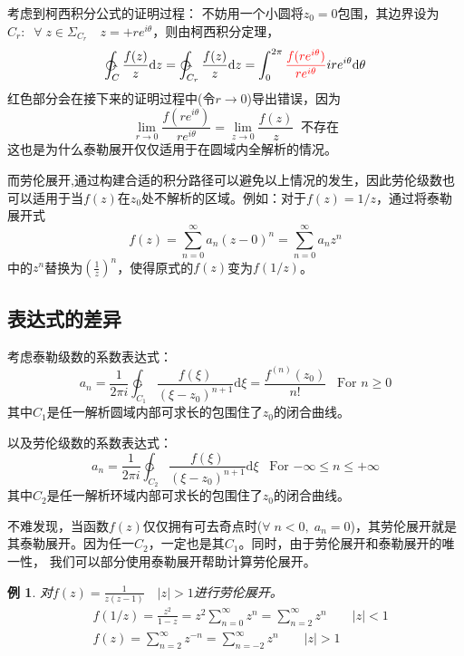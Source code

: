 \documentclass[12pt, a4paper, oneside]{ctexart}
\newtheorem{example}[theorem]{例}
\def\D{\mathrm{d}}
\newcommand{\F}[1][z]
{\ensuremath{f(#1)}}
\begin{document}
考虑到柯西积分公式的证明过程：
不妨用一个小圆将$z_0=0$包围，其边界设为$\displaystyle C_r: \;\;\forall \; z\in \Sigma_{C_r}\quad z=+re^{i\theta}$，则由柯西积分定理，
\begin{align*}
    \ointctrclockwise_C \frac{\F}{z}\D z =\ointctrclockwise_{C_r}\frac{\F}{z}\D z =\int_0^{2\pi}{\color{red}\frac{\F[re^{i\theta}]}{re^{i\theta}}}ire^{i\theta}\D \theta
\end{align*}
{\color{red} 红色}部分会在接下来的证明过程中(令$r\to 0$)导出错误，因为
$$
    \lim_{r\to 0} \frac{\F[re^{i\theta}]}{re^{i\theta}} = \lim_{z\to 0} \frac{f(z)}{z} \;\; \text{不存在}
$$
这也是为什么泰勒展开仅仅适用于在圆域内全解析的情况。

而劳伦展开,通过构建合适的积分路径可以避免以上情况的发生，因此劳伦级数也可以适用于当$f(z)$在$z_0$处不解析的区域。例如：对于$f(z)=1/z$，通过将泰勒展开式
$$
    f(z)=\sum_{n=0}^\infty a_n(z-0)^n=\sum_{n=0}^\infty a_n z^n
$$
中的$z^n$替换为$\displaystyle(\frac{1}{z})^n$，使得原式的$f(z)$变为$f(1/z)$。

\subsection{表达式的差异}

考虑泰勒级数的系数表达式：
$$
    a_n=\frac{1}{2\pi i}\ointctrclockwise_{C_1} \frac{\F[\xi]}{(\xi-z_0)^{n+1}}\D \xi=\frac{f^{(n)}(z_0)}{n!}\;\;\; \text{For $n\ge 0$}
$$
其中$C_1$是任一解析圆域内部可求长的包围住了$z_0$的闭合曲线。

以及劳伦级数的系数表达式：
$$
    a_n=\frac{1}{2\pi i}\ointctrclockwise_{C_2} \frac{\F[\xi]}{(\xi-z_0)^{n+1}}\D \xi \;\;\; \text{For $-\infty \le n\le +\infty$}
$$
其中$C_2$是任一解析环域内部可求长的包围住了$z_0$的闭合曲线。

不难发现，当函数$f(z)$仅仅拥有可去奇点时($\forall \; n < 0, \;a_n=0$)，其劳伦展开就是其泰勒展开。因为任一$C_2$，一定也是其$C_1$。同时，由于劳伦展开和泰勒展开的唯一性，
我们可以部分使用泰勒展开帮助计算劳伦展开。
\begin{example}
    对$f(z)=\displaystyle \frac{1}{z(z-1)}\quad |z|>1$进行劳伦展开。
    \begin{align*}
        &f(1/z)=\frac{z^2}{1-z}=z^2 \sum_{n=0}^\infty z^n = \sum_{n=2}^\infty z^n \qquad |z|<1 \\
        &f(z)=\sum_{n=2}^\infty z^{-n}=\sum_{n=-2}^\infty z^n \qquad |z|>1
    \end{align*}
\end{example}
\end{document}
